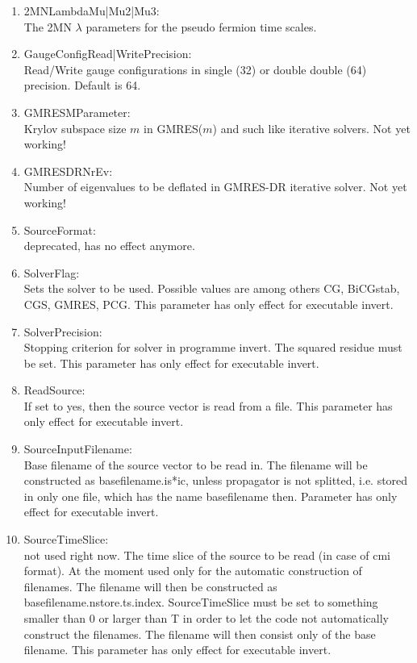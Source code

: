 \begin{enumerate}
\item {\ttfamily 2MNLambdaMu|Mu2|Mu3}:\\
  The 2MN $\lambda$ parameters for the pseudo fermion time scales.

\item {\ttfamily GaugeConfigRead|WritePrecision}:\\
  Read/Write gauge configurations in single (32) or double double (64)
  precision. Default is 64.

\item {\ttfamily GMRESMParameter}:\\
  Krylov subspace size $m$ in GMRES($m$) and such like iterative
  solvers. Not yet working!

\item {\ttfamily GMRESDRNrEv}:\\
  Number of eigenvalues to be deflated in GMRES-DR iterative
  solver. Not yet working!

\item {\ttfamily SourceFormat}:\\
  deprecated, has no effect anymore.

\item {\ttfamily SolverFlag}:\\
  Sets the solver to be used. Possible values are among others
  {\ttfamily CG, BiCGstab, CGS, GMRES, PCG}. This parameter has only
  effect for executable {\ttfamily invert}.

\item {\ttfamily SolverPrecision}:\\
  Stopping criterion for solver in programme invert. The squared
  residue must be set. This parameter has only
  effect for executable {\ttfamily invert}.

\item {\ttfamily ReadSource}:\\
  If set to yes, then the source vector is read from a file. This
  parameter has only effect for executable {\ttfamily invert}.

\item {\ttfamily SourceInputFilename}:\\
  Base filename of the source vector to be read in. The filename will
  be constructed as {\ttfamily basefilename.is*ic},
  unless propagator is not splitted, i.e. stored in only one file,
  which has the name {\ttfamily basefilename} then.
  Parameter has only effect for executable {\ttfamily invert}.

\item {\ttfamily SourceTimeSlice}:\\
  not used right now.
  The time slice of the source to be read (in case of cmi format). At
  the moment used only for
  the automatic construction of filenames. The filename will then be
  constructed as {\ttfamily basefilename.nstore.ts.index}.
  {\ttfamily SourceTimeSlice} must be set to something
  smaller than 0 or larger than T in order to let the code not
  automatically construct the filenames. The filename will then
  consist only of the base filename. This parameter has only
  effect for executable {\ttfamily invert}.


\end{enumerate}
